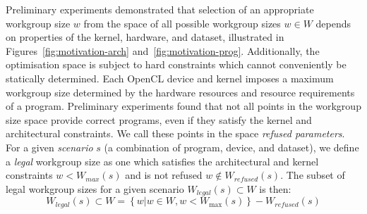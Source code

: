\documentclass[hidelinks]{acaces}
\begin{document}
  Preliminary experiments demonstrated that selection of an appropriate
  workgroup size $w$ from the space of all possible workgroup sizes
  $w \in W$ depends on properties of the kernel, hardware, and dataset,
  illustrated in Figures~\ref{fig:motivation-arch}
  and~\ref{fig:motivation-prog}. Additionally, the optimisation space is
  subject to hard constraints which cannot conveniently be statically
  determined. Each OpenCL device and kernel imposes a maximum workgroup
  size determined by the hardware resources and resource requirements of
  a program. Preliminary experiments found that not all points in the
  workgroup size space provide correct programs, even if they satisfy
  the kernel and architectural constraints. We call these points in the
  space \emph{refused parameters}. For a given \emph{scenario} $s$ (a
  combination of program, device, and dataset), we define a
  \textit{legal} workgroup size as one which satisfies the architectural
  and kernel constraints $w < W_{max}(s)$ and is not refused
  $w \notin W_{refused}(s)$. The subset of legal workgroup sizes for a
  given scenario $W_{legal}(s) \subset W$ is then:
  \begin{equation}
    W_{legal}(s) \subset W = \left\{w | w \in W, w < W_{\max}(s) \right\} - W_{refused}(s)
  \end{equation}
\end{document}
